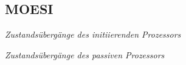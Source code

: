 \subsection{MOESI}
\begin{minipage}{\linewidth}
\centering

{\small\textit{Zustandsübergänge des initiierenden Prozessors}}

{\small\textit{Zustandsübergänge des passiven Prozessors}}
\end{minipage}

